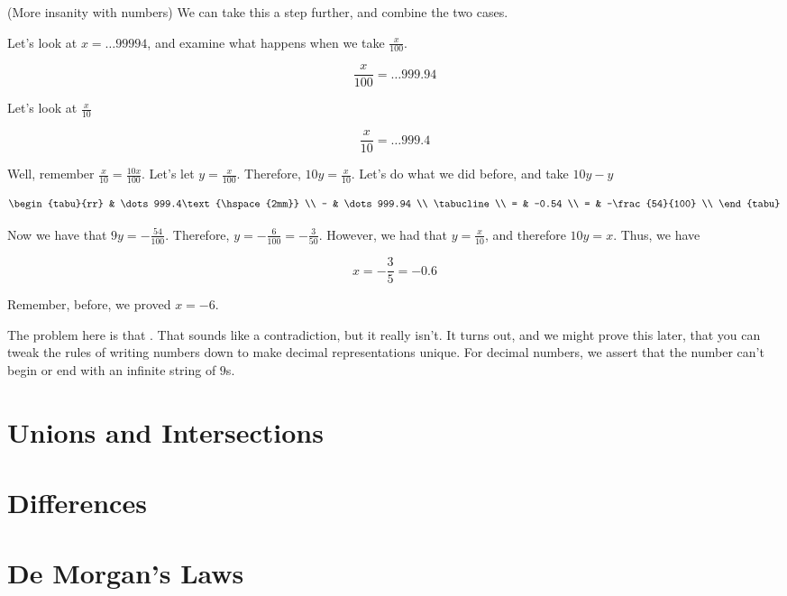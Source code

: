 \begin{example}(More insanity with numbers)
  We can take this a step further, and combine the two cases.

  Let's look at $x = \dots99994$, and examine what happens when we
  take $\frac{x}{100}$.

  \begin{displaymath}
    \frac{x}{100} = \dots999.94
  \end{displaymath}

  Let's look at $\frac{x}{10}$

  \begin{displaymath}
    \frac{x}{10} = \dots999.4
  \end{displaymath}

  Well, remember $\frac{x}{10} = \frac{10x}{100}$. Let's let
  $y = \frac{x}{100}$. Therefore, $10y = \frac{x}{10}$. Let's do what
  we did before, and take $10y - y$

  \begin{displaymath}
    \begin{tabu}{rr}
        & \dots999.4\text{\hspace{2mm}} \\
      - & \dots999.94 \\
      \tabucline \\
      = & -0.54 \\
      = & -\frac{54}{100} \\
    \end{tabu}
  \end{displaymath}

  Now we have that $9y = -\frac{54}{100}$. Therefore, $y =
  -\frac{6}{100} = -\frac{3}{50}$. However, we had that $y =
  \frac{x}{10}$, and therefore $10y = x$. Thus, we have

  \begin{displaymath}
    x = -\frac{3}{5} = -0.6
  \end{displaymath}

  Remember, before, we proved $x = -6$.
\end{example}

The problem here is that . That sounds like a contradiction, but
it really isn't. It turns out, and we might prove this later, that you
can tweak the rules of writing numbers down to make decimal
representations unique. For decimal numbers, we assert that the number
can't begin or end with an infinite string of $9$s.

\section{Unions and Intersections}
\section{Differences}
\section{De Morgan's Laws}
